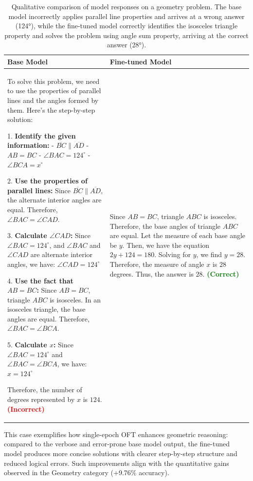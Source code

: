 \documentclass{article}
\begin{document}
\begin{table}[h]
\centering
\small
\begin{tabular}{p{} p{}}
\toprule
\textbf{Base Model} & \textbf{Fine-tuned Model} \\
\midrule
To solve this problem, we need to use the properties of parallel lines and the angles formed by them. Here's the step-by-step solution:

1. \textbf{Identify the given information:}
   - $\overline{BC} \parallel \overline{AD}$
   - $AB = BC$
   - $\angle BAC = 124^\circ$
   - $\angle BCA = x^\circ$

2. \textbf{Use the properties of parallel lines:}
   Since $\overline{BC} \parallel \overline{AD}$, the alternate interior angles are equal. Therefore, $\angle BAC = \angle CAD$.

3. \textbf{Calculate $\angle CAD$:}
   Since $\angle BAC = 124^\circ$, and $\angle BAC$ and $\angle CAD$ are alternate interior angles, we have:
   $
   \angle CAD = 124^\circ
   $

4. \textbf{Use the fact that $AB = BC$:}
   Since $AB = BC$, triangle $ABC$ is isosceles. In an isosceles triangle, the base angles are equal. Therefore, $\angle BAC = \angle BCA$.

5. \textbf{Calculate $x$:}
   Since $\angle BAC = 124^\circ$ and $\angle BAC = \angle BCA$, we have:
   $
   x = 124^\circ
   $

Therefore, the number of degrees represented by $x$ is $\boxed{124}$.
\textcolor{red}{\textbf{(Incorrect)}}
&
Since $AB = BC$, triangle $ABC$ is isosceles. Therefore, the base angles of triangle $ABC$ are equal. Let the measure of each base angle be $y$. Then, we have the equation $2y + 124 = 180$. Solving for $y$, we find $y = 28$. Therefore, the measure of angle $x$ is $28$ degrees. Thus, the answer is $\boxed{28}$.
\textcolor{green}{\textbf{(Correct)}}
\\
\bottomrule
\end{tabular}
\caption{Qualitative comparison of model responses on a geometry problem. The base model incorrectly applies parallel line properties and arrives at a wrong answer (124°), while the fine-tuned model correctly identifies the isosceles triangle property and solves the problem using angle sum property, arriving at the correct answer (28°).}
\label{tab:case_study}
\end{table}

This case exemplifies how single-epoch OFT enhances geometric reasoning: compared to the verbose and error-prone base model output, the fine-tuned model produces more concise solutions with clearer step-by-step structure and reduced logical errors. Such improvements align with the quantitative gains observed in the Geometry category (+9.76\% accuracy).
\end{document}

